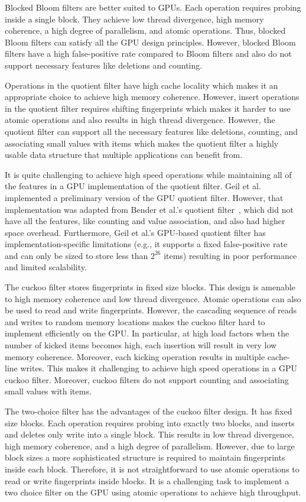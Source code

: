 Blocked Bloom filters are better suited to GPUs.  Each operation requires
probing inside a single block. They achieve low thread divergence, high memory
coherence, a high degree of parallelism, and atomic operations. Thus, blocked
Bloom filters can satisfy all the GPU design principles. However, blocked Bloom
filters have a high false-positive rate compared to Bloom filters and also do
not support necessary features like deletions and counting.

Operations in the quotient filter have high cache locality which makes it an
appropriate choice to achieve high memory coherence. However, insert operations
in the quotient filter requires shifting fingerprints which makes it harder to
use atomic operations and also results in high thread divergence. However, the
quotient filter can support all the necessary features like deletions, counting,
and associating small values with items which makes the quotient filter a highly
usable data structure that multiple applications can benefit from.

It is quite challenging to achieve high speed operations while maintaining all
of the features in a GPU implementation of the quotient filter. Geil et
al.~\cite{Geil:2018:QFA} implemented a preliminary version of the GPU quotient filter.
However, that implementation was adapted from Bender et al.'s quotient
filter~\cite{BenderFaJo12}, which did not have all the features, like counting
and value association, and also had higher space overhead. Furthermore, Geil et
al.'s GPU-based quotient filter has implementation-specific limitations (e.g., it
supports a fixed false-positive rate and can only be sized to store less than
$2^{26}$ items) resulting in poor performance and limited scalability.

The cuckoo filter stores fingerprints in fixed size blocks. This design is
amenable to high memory coherence and low thread divergence. Atomic operations
can also be used to read and write fingerprints. However, the cascading sequence
of reads and writes to random memory locations makes the cuckoo filter hard to
implement efficiently on the GPU\@. In particular, at high load factors when the
number of kicked items becomes high, each insertion will result in very low
memory coherence. Moreover, each kicking operation results in multiple
cache-line writes. This makes it challenging to achieve high speed operations in
a GPU cuckoo filter. Moreover, cuckoo filters do not support counting and
associating small values with items.

The two-choice filter has the advantages of the cuckoo filter design. It has
fixed size blocks. Each operation requires probing into exactly two blocks, and
inserts and deletes only write into a single block. This results in low thread
divergence, high memory coherence, and a high degree of parallelism. However,
due to large block sizes a more sophisticated structure is required to maintain
fingerprints inside each block. Therefore, it is not straightforward to use
atomic operations to read or write fingerprints inside blocks. It is a
challenging task to implement a two choice filter on the GPU using atomic
operations to achieve high throughput.

\fi
